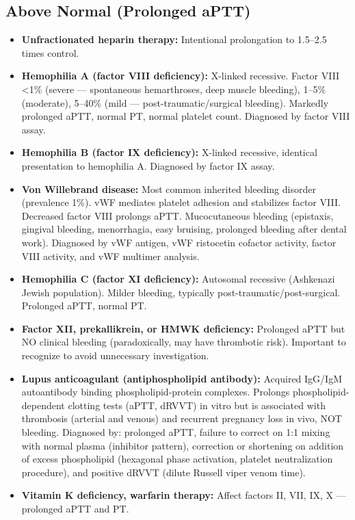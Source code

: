\subsection*{Above Normal (Prolonged aPTT)}
\begin{itemize}
  \item \textbf{Unfractionated heparin therapy:} Intentional prolongation to 1.5--2.5 times control.
  \item \textbf{Hemophilia A (factor VIII deficiency):} X-linked recessive. Factor VIII <1\% (severe --- spontaneous hemarthroses, deep muscle bleeding), 1--5\% (moderate), 5--40\% (mild --- post-traumatic/surgical bleeding). Markedly prolonged aPTT, normal PT, normal platelet count. Diagnosed by factor VIII assay.
  \item \textbf{Hemophilia B (factor IX deficiency):} X-linked recessive, identical presentation to hemophilia A. Diagnosed by factor IX assay.
  \item \textbf{Von Willebrand disease:} Most common inherited bleeding disorder (prevalence 1\%). vWF mediates platelet adhesion and stabilizes factor VIII. Decreased factor VIII prolongs aPTT. Mucocutaneous bleeding (epistaxis, gingival bleeding, menorrhagia, easy bruising, prolonged bleeding after dental work). Diagnosed by vWF antigen, vWF ristocetin cofactor activity, factor VIII activity, and vWF multimer analysis.
  \item \textbf{Hemophilia C (factor XI deficiency):} Autosomal recessive (Ashkenazi Jewish population). Milder bleeding, typically post-traumatic/post-surgical. Prolonged aPTT, normal PT.
  \item \textbf{Factor XII, prekallikrein, or HMWK deficiency:} Prolonged aPTT but NO clinical bleeding (paradoxically, may have thrombotic risk). Important to recognize to avoid unnecessary investigation.
  \item \textbf{Lupus anticoagulant (antiphospholipid antibody):} Acquired IgG/IgM autoantibody binding phospholipid-protein complexes. Prolongs phospholipid-dependent clotting tests (aPTT, dRVVT) in vitro but is associated with thrombosis (arterial and venous) and recurrent pregnancy loss in vivo, NOT bleeding. Diagnosed by: prolonged aPTT, failure to correct on 1:1 mixing with normal plasma (inhibitor pattern), correction or shortening on addition of excess phospholipid (hexagonal phase activation, platelet neutralization procedure), and positive dRVVT (dilute Russell viper venom time).
  \item \textbf{Vitamin K deficiency, warfarin therapy:} Affect factors II, VII, IX, X --- prolonged aPTT and PT.

\end{itemize}
